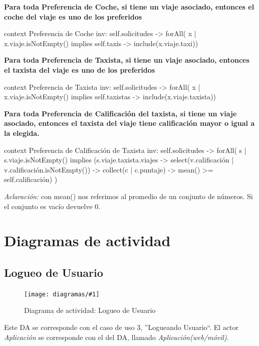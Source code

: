 \documentclass[a4paper, 10pt, twoside]{article}
\newcommand{\diagramavfig}[2]{%
  \begin{figure}[H]
    \texttt{[image: diagramas/\#1]}%
    \caption{#2}
    \label{fig:#1}
  \end{figure}
}
\newenvironment{ocl}[1]
  {
    \textbf{#1}
    \verbatim
  }{
    \endverbatim
  }
\begin{document}
  
 
\begin{ocl}{Para toda Preferencia de Coche, si tiene un viaje asociado, entonces el coche del viaje es uno de los preferidos}
  context Preferencia de Coche
  inv: self.solicitudes -> forAll( x | x.viaje.isNotEmpty() implies 
       self.taxis -> include(x.viaje.taxi))
\end{ocl}


\begin{ocl}{Para toda Preferencia de Taxista, si tiene un viaje asociado, entonces el taxista del viaje es uno de los preferidos}
  context Preferencia de Taxista
  inv: self.solicitudes -> forAll( x | x.viaje.isNotEmpty() implies 
       self.taxistas -> include(x.viaje.taxista))
\end{ocl}


\begin{ocl}{Para toda Preferencia de Calificación del taxista, si tiene un viaje asociado, entonces el taxista del viaje tiene calificación mayor o igual a la elegida.}
  context Preferencia de Calificación de Taxista
  inv: self.solicitudes -> forAll( s | s.viaje.isNotEmpty() implies 
       (s.viaje.taxista.viajes -> select(v.calificación | v.calificación.isNotEmpty()) ->
       collect(c | c.puntaje) -> mean() >= self.calificación) )
\end{ocl}

\emph{Aclaración:} con mean() nos referimos al promedio de un conjunto de números. Si el conjunto es vacío devuelve 0.



\section{Diagramas de actividad}

\subsection{Logueo de Usuario}
\label{sec:da-logueo-de-usuario}
\diagramavfig{da-logueo-de-usuario}{Diagrama de actividad: Logueo de Usuario}

Este DA se corresponde con el caso de uso 3, ''Logueando Usuario``. El actor \emph{Aplicación} se corresponde con el del DA, llamado \emph{Aplicación(web/móvil)}.
\end{document}
